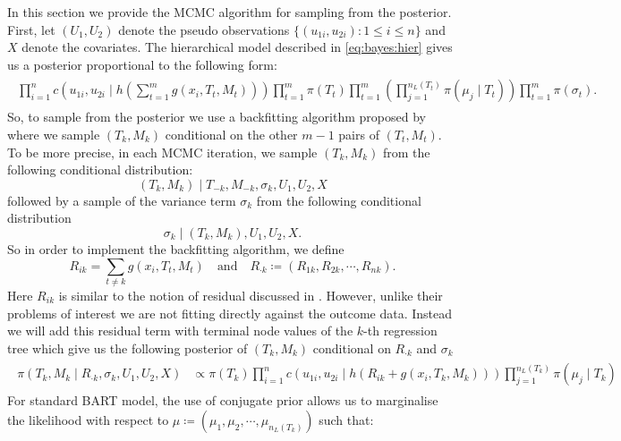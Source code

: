 \documentclass{amsart}
\begin{document}
In this section we provide the MCMC algorithm for sampling from the posterior. First, let $(U_1,U_2)$ denote the pseudo observations $\{(u_{1i},u_{2i}):1\le i \le n\}$ and $X$ denote the covariates. The hierarchical model described in \cref{eq:bayes:hier} gives us a posterior proportional to the following form:
\begin{align}
	\begin{split}
		\prod_{i=1}^{n}c\left(u_{1i},u_{2i}\mid h\left(\sum_{t=1}^m g(x_i, T_t, M_t)\right)\right)\prod_{t=1}^{m}\pi(T_t)\prod_{t=1}^{m}\left(\prod_{j=1}^{n_L(T_t)}\pi(\mu_j\mid T_t)\right)\prod_{t=1}^{m}\pi(\sigma_{t}).
	\end{split}
\end{align}
So, to sample from the posterior we use a backfitting algorithm proposed by \citet{chipman2010BART} where we sample $(T_k, M_k)$ conditional on the other $m-1$ pairs of $(T_t,M_t)$. To be more precise, in each MCMC iteration, we sample $(T_k, M_k)$ from the following conditional distribution: 
\begin{equation*}
	(T_k,M_k)\mid T_{-k},M_{-k}, \sigma_{k}, U_1, U_2, X
\end{equation*}
followed by a sample of the variance term $\sigma_{k}$ from the following conditional distribution
\begin{equation*}
	\sigma_{k} \mid (T_k,M_k),U_1,U_2,X.
\end{equation*}
So in order to implement the backfitting algorithm, we define 
\begin{equation*}
	R_{ik} = \sum_{t\not=k}g(x_i, T_t, M_t)\quad\text{and}\quad R_{\cdot k}\coloneqq(R_{1k},R_{2k},\cdots,R_{nk}).
\end{equation*}
Here $R_{ik}$ is similar to the notion of residual discussed in \citet{chipman2010BART, serafini2024lossbasedpriortreetopologies}. However, unlike their problems of interest we are not fitting directly against the outcome data. Instead we will add this residual term with terminal node values of the $k$-th regression tree which give us the following posterior of $(T_k,M_k)$ conditional on $R_{\cdot k}$ and $\sigma_{k}$
\begin{align}\label{eq:post:res}
	\begin{split}
		\pi(T_k,M_k \mid R_{\cdot k}, \sigma_{k}, U_1,U_2, X) &\propto \pi(T_k)\prod_{i=1}^{n}c\left(u_{1i},u_{2i}\mid h\left(R_{ik}+g(x_i, T_k, M_k)\right)\right)\prod_{j=1}^{n_L(T_k)}\pi(\mu_j\mid T_k)
	\end{split}
\end{align}
For standard BART model, the use of conjugate prior allows us to marginalise the likelihood with respect to $\mu\coloneqq\left(\mu_1,\mu_2,\cdots,\mu_{n_L(T_k)}\right)$ such that:
\end{document}
